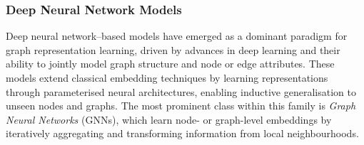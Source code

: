 \subsubsection{Deep Neural Network Models}
\label{sec:theory:gnn}

Deep neural network–based models have emerged as a dominant paradigm for graph representation learning, driven by advances in deep learning and their ability to jointly model graph structure and node or edge attributes. These models extend classical embedding techniques by learning representations through parameterised neural architectures, enabling inductive generalisation to unseen nodes and graphs. The most prominent class within this family is \emph{Graph Neural Networks} (GNNs), which learn node- or graph-level embeddings by iteratively aggregating and transforming information from local neighbourhoods.

